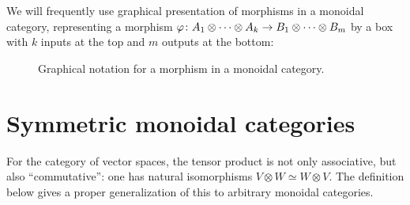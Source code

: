 \begin{convention}\label{c:graphical-monoidal}
We will frequently use graphical presentation of morphisms
in a monoidal category, representing a morphism
$\varphi \colon A_1\otimes \dots \otimes A_k\to B_1\otimes\dots \otimes B_m$
by a box with $k$ inputs at the top and $m$ outputs at the bottom:
\begin{figure}[h]
  \centering
  \caption{Graphical notation for a morphism in a monoidal category.}
  \label{f:graphical-morphism}
\end{figure}
\end{convention}







\section{Symmetric monoidal categories}\label{s:symmetric-monoidal}
For the category of vector spaces, the tensor product is not only associative,
but also ``commutative'': one has natural isomorphisms $V\otimes W \simeq
W\otimes V$. The definition below gives a proper generalization of this to
arbitrary monoidal categories.

